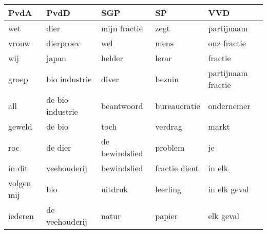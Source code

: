 \begin{tabular}{lllll}
\toprule
       PvdA &              PvdD &             SGP &             SP &                 VVD \\
\midrule
        wet &              dier &    mijn fractie &           zegt &          partijnaam \\
      vrouw &         dierproev &             wel &           mens &         onz fractie \\
        wij &             japan &          helder &          lerar &             fractie \\
      groep &     bio industrie &           diver &         bezuin &  partijnaam fractie \\
        all &  de bio industrie &      beantwoord &   bureaucratie &          ondernemer \\
     geweld &            de bio &            toch &        verdrag &               markt \\
        roc &           de dier &  de bewindslied &        problem &                  je \\
     in dit &       veehouderij &     bewindslied &  fractie dient &              in elk \\
 volgen mij &               bio &         uitdruk &       leerling &        in elk geval \\
    iederen &    de veehouderij &           natur &         papier &           elk geval \\
\bottomrule
\end{tabular}
